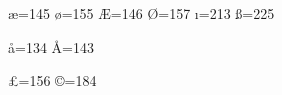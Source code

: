 



\chardef\ae=145	%
\chardef\o=155  %
\chardef\AE=146 %
\chardef\O=157  %
\chardef\i=213  %
\chardef\ss=225	%


\chardef\aa=134 \chardef\AA=143 %
\chardef{} \chardef{} %



\chardef\pounds=156 \chardef\copyright=184


\chardef{} \chardef{}		%
\chardef{} \chardef{}		%



\def\'#1{{\accent239 #1}}	%
\def\"#1{{\accent249 #1}}	%
\def\=#1{{\accent238 #1}}	%

